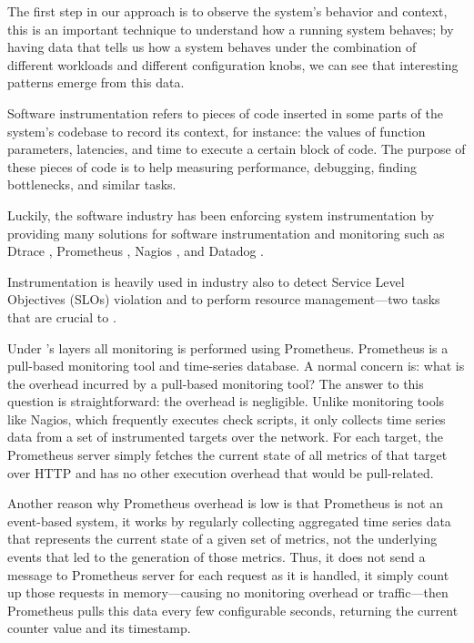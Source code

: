 The first step in our approach is to observe the system's behavior and context, this is an important technique to understand how a running system behaves; by having data that tells us how a system behaves under the combination of different workloads and different configuration knobs, we can see that interesting patterns emerge from this data.

Software instrumentation refers to pieces of code inserted in some parts of the system's codebase to record its context, for instance: the values of function parameters, latencies, and time to execute a certain block of code. The purpose of these pieces of code is to help measuring performance, debugging, finding bottlenecks, and similar tasks.

Luckily, the software industry has been enforcing system instrumentation by providing many solutions for software instrumentation and monitoring such as Dtrace \cite{cantrill_dynamic_2004}, Prometheus \cite{Prometheus}, Nagios \cite{Nagios}, and Datadog \cite{Datadog}.

Instrumentation is heavily used in industry also to detect Service Level Objectives (SLOs) violation and to perform resource management---two tasks that are crucial to \projectname{}.

Under \projectname{}'s layers all monitoring is performed using Prometheus. Prometheus is a pull-based monitoring tool and time-series database. A normal concern is: what is the overhead incurred by a pull-based monitoring tool? The answer to this question is straightforward: the overhead is negligible. Unlike monitoring tools like Nagios, which frequently executes check scripts, it only collects time series data from a set of instrumented targets over the network. For each target, the Prometheus server simply fetches the current state of all metrics of that target over HTTP and has no other execution overhead that would be pull-related.

Another reason why Prometheus overhead is low is that Prometheus is not an event-based system, it works by regularly collecting aggregated time series data that represents the current state of a given set of metrics, not the underlying events that led to the generation of those metrics. Thus, it does not send a message to Prometheus server for each request as it is handled, it simply count up those requests in memory---causing no monitoring overhead or traffic---then Prometheus pulls this data every few configurable seconds, returning the current counter value and its timestamp.

